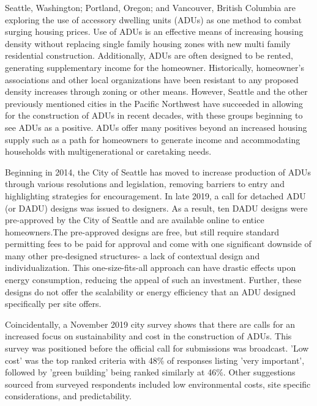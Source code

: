 \documentclass[sagev,doublespace,times,Review]{sagej}
\begin{document}
Seattle, Washington; Portland, Oregon; and Vancouver, British Columbia are exploring the use of accessory dwelling units (ADUs) as one method to combat surging housing prices. Use of ADUs is an effective means of increasing housing density without replacing single family housing zones with new multi family residential construction. Additionally, ADUs are often designed to be rented, generating supplementary income for the homeowner. Historically, homeowner’s associations and other local organizations have  been resistant to any proposed density increases through zoning or other means. However, Seattle and the other previously mentioned cities in the Pacific Northwest have succeeded in allowing for the construction of ADUs in recent decades, with these groups beginning to see ADUs as a positive. ADUs offer many positives beyond an increased housing supply such as a path for homeowners to generate income and accommodating households with multigenerational or caretaking needs.

Beginning in 2014, the City of Seattle has moved to increase production of ADUs through various resolutions and legislation, removing barriers to entry and highlighting strategies for encouragement. In late 2019, a call for detached ADU (or DADU) designs was issued to designers. As a result, ten DADU designs were pre-approved by the City of Seattle and are available online to entice homeowners.The pre-approved designs are free, but still require standard permitting fees to be paid for approval and come with one significant downside of many other pre-designed structures- a lack of contextual design and individualization. This one-size-fits-all approach can have drastic effects upon energy consumption, reducing the appeal of such an investment. Further, these designs do not offer the scalability or energy efficiency that an ADU designed specifically per site offers.

 Coincidentally, a November 2019 city survey shows that there are calls for an increased focus on sustainability and cost in the construction of ADUs\cite{seattlePreapprovedPlansAccessory2019}. This survey was positioned before the official call for submissions was broadcast. 'Low cost' was the top ranked criteria with 48\% of responses listing 'very important', followed by 'green building' being ranked similarly at 46\%. Other suggestions sourced from surveyed respondents included low environmental costs, site specific considerations, and predictability. 
 
\end{document}
